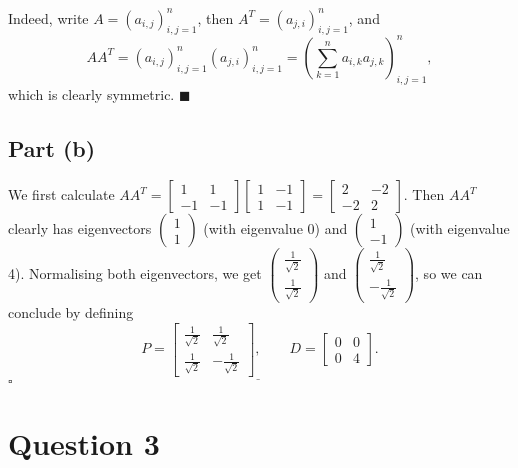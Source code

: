 \documentclass[12pt]{article}
\begin{document}
Indeed, write $A=(a_{i,j})_{i,j=1}^n$, then $A^T=(a_{j, i})_{i,j=1}^n$, and
\[
    AA^T=(a_{i,j})_{i,j=1}^n(a_{j,i})_{i,j=1}^n
    =\left(\sum_{k=1}^n a_{i,k}a_{j,k}\right)_{i,j=1}^n,
\]
which is clearly symmetric. \hfill$\blacksquare$

\subsection*{Part (b)}
We first calculate
$AA^T=
\begin{bmatrix} 1&1\\-1&-1 \end{bmatrix} 
\begin{bmatrix} 1&-1\\1&-1 \end{bmatrix}
=\begin{bmatrix} 2&-2\\-2&2 \end{bmatrix} $.
Then $AA^T$ clearly has eigenvectors
$\begin{pmatrix} 1\\1 \end{pmatrix} $ (with eigenvalue 0)
and $\begin{pmatrix} 1\\-1 \end{pmatrix}$ (with eigenvalue 4).
Normalising both eigenvectors, we get
$\begin{pmatrix} \frac{1}{\sqrt{2}}\\\frac{1}{\sqrt{2}} \end{pmatrix} $
and $\begin{pmatrix} \frac{1}{\sqrt{2}}\\-\frac{1}{\sqrt{2}} \end{pmatrix} $,
so we can conclude by defining
\[
    \underline{
P=\begin{bmatrix}
    \frac{1}{\sqrt{2}}&\frac{1}{\sqrt{2}}
    \\\frac{1}{\sqrt{2}}&-\frac{1}{\sqrt{2}}
\end{bmatrix},
\qquad
D=\begin{bmatrix} 0&0\\0&4 \end{bmatrix}
}.
\]
\hfill$\square$

\newpage
\section*{Question 3}
\end{document}
